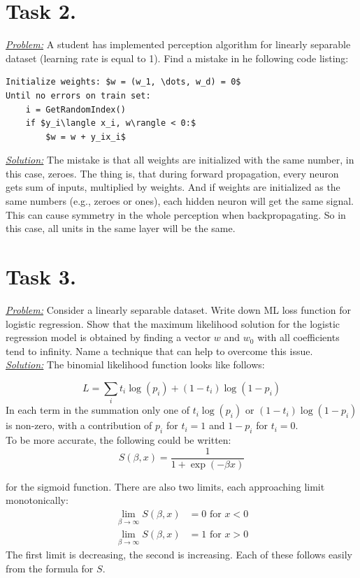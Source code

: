 \documentclass[a4paper,12pt]{article}
\begin{document}
\newpage
\section*{Task 2.}
\underline{\textit{Problem:}} A student has implemented perception algorithm for linearly separable dataset (learning rate is equal
to 1). Find a mistake in he following code listing:
\begin{lstlisting}[mathescape]
Initialize weights: $w = (w_1, \dots, w_d) = 0$
Until no errors on train set:
    i = GetRandomIndex()
    if $y_i\langle x_i, w\rangle < 0:$
        $w = w + y_ix_i$
\end{lstlisting}
\underline{\textit{Solution:}} The mistake is that all weights are initialized
with the same number, in this case, zeroes. The thing is, that during forward
propagation, every neuron gets sum of inputs, multiplied by weights. And if
weights are initialized as the same numbers (e.g., zeroes or ones), each hidden
neuron will get the same signal. This can cause symmetry in the whole
perception when backpropagating. So in this case, all units in the same layer
will be the same.

\newpage
\section*{Task 3.}
\underline{\textit{Problem:}} Consider a linearly separable dataset. Write down ML loss function for logistic regression. Show that
the maximum likelihood solution for the logistic regression model is obtained by finding a vector \(w\) and
\(w_0\) with all coefficients tend to infinity.
Name a technique that can help to overcome this issue.\\
\newline
\underline{\textit{Solution:}} The binomial likelihood function looks like
follows:

\[
    L = \sum_it_i\log(p_i) + (1-t_i)\log(1-p_i)
\]
In each term in the summation only one of \(t_i\log(p_i)\) or
\((1-t_i)\log(1-p_i)\) is non-zero, with a contribution of \(p_i\) for \(t_i =
1\) and \(1-p_i\) for \(t_i = 0\).\\
\newline
To be more accurate, the following could be written:
\[
    S(\beta,x) = \frac{1}{1+\exp(-\beta x)}
\]

for the sigmoid function. There are also two limits, each approaching limit monotonically:
\begin{align}
    \lim_{\beta\rightarrow\infty} S(\beta,x) &= 0 \text{ for  }x < 0\\
    \lim_{\beta\rightarrow\infty} S(\beta,x) &= 1 \text{ for  }x > 0
\end{align}
The first limit is decreasing, the second is increasing. Each of these follows easily from the formula for \(S\).
\end{document}
